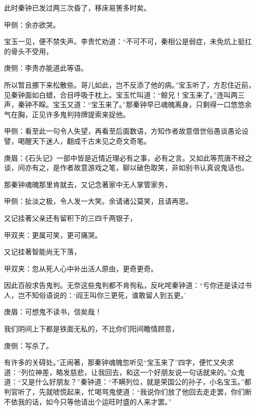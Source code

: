 \begin{parag}
    此时秦钟已发过两三次昏了，移床易箦多时矣。\begin{note}甲侧：余亦欲哭。\end{note}宝玉一见，便不禁失声。李贵忙劝道：“不可不可，秦相公是弱症，未免炕上挺扛的骨头不受用，\begin{note}庚侧：李贵亦能道此等语。\end{note}所以暂且挪下来松散些。哥儿如此，岂不反添了他的病。”宝玉听了，方忍住近前，见秦钟面如白蜡，合目呼吸于枕上。宝玉忙叫道：“鲸兄！宝玉来了。”连叫两三声，秦钟不睬。宝玉又道：“宝玉来了。”那秦钟早已魂魄离身，只剩得一口悠悠余气在胸，正见许多鬼判持牌提索来捉他。\begin{note}甲侧：看至此一句令人失望，再看至后面数语，方知作者故意借世俗愚谈愚论设譬，喝醒天下迷人，翻成千古未见之奇文奇笔。\end{note}\begin{note}庚眉：《石头记》一部中皆是近情近理必有之事，必有之言。又如此等荒唐不经之谈，间亦有之，是作者故意游戏之笔，聊以破色取笑，非如别书认真说鬼话也。\end{note}那秦钟魂魄那里肯就去，又记念著家中无人掌管家务，\begin{note}甲侧：扯淡之极，令人发一大笑。余请诸公莫笑，且请再思。\end{note}又记挂著父亲还有留积下的三四千两银子，\begin{note}甲双夹：更属可笑，更可痛哭。\end{note}又记挂著智能尚无下落，\begin{note}甲双夹：忽从死人心中补出活人原由，更奇更奇。\end{note}因此百般求告鬼判。无奈这些鬼判都不肯徇私，反叱咤秦钟道：“亏你还是读过书人，岂不知俗语说的：‘阎王叫你三更死，谁敢留人到五更。’\begin{note}庚眉：可想鬼不读书，信矣哉！\end{note}我们阴间上下都是铁面无私的，不比你们阳间瞻情顾意，\begin{note}庚侧：写杀了。\end{note}有许多的关碍处。”正闹著，那秦钟魂魄忽听见“宝玉来了”四字，便忙又央求道：“列位神差，略发慈悲，让我回去，和这一个好朋友说一句话就来的。”众鬼道：“又是什么好朋友？”秦钟道：“不瞒列位，就是荣国公的孙子，小名宝玉。”都判官听了，先就唬慌起来，忙喝骂鬼使道：“我说你们放了他回去走走罢，你们断不依我的话，如今只等他请出个运旺时盛的人来才罢。”
\end{parag}
